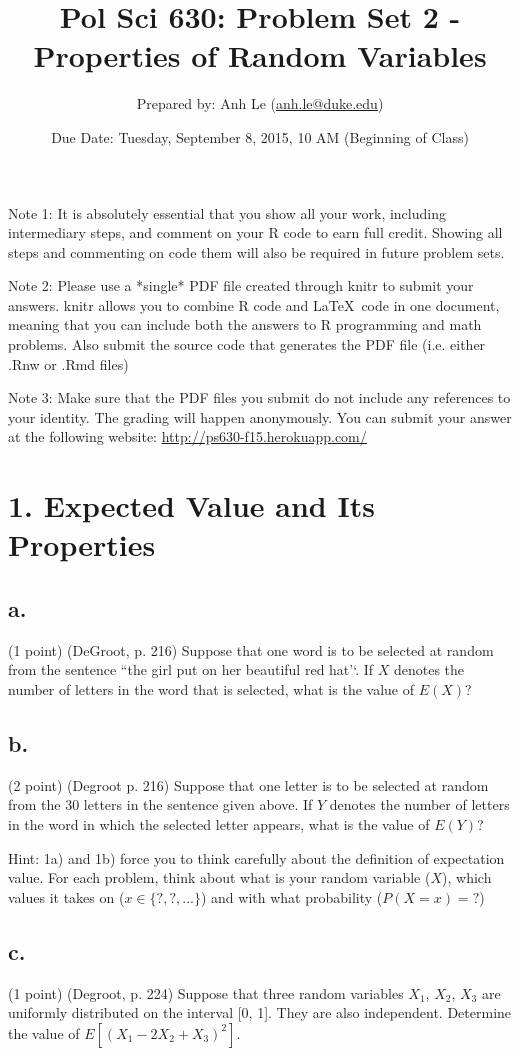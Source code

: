 \documentclass{article}\usepackage[]{graphicx}\usepackage[]{color}
\title{Pol Sci 630: Problem Set 2 - Properties of Random Variables}
\author{Prepared by: Anh Le (\href{mailto:anh.le@duke.edu}{anh.le@duke.edu})}
\date{Due Date: Tuesday, September 8, 2015, 10 AM (Beginning of Class)}
\begin{document}
\maketitle

Note 1: It is absolutely essential that you show all your work, including intermediary steps, and comment on your R code to earn full credit. Showing all steps and commenting on code them will also be required in future problem sets.

Note 2: Please use a *single* PDF file created through knitr to submit your answers. knitr allows you to combine R code and \LaTeX \ code in one document, meaning that you can include both the answers to R programming and math problems. Also submit the source code that generates the PDF file (i.e. either .Rnw or .Rmd files)

Note 3: Make sure that the PDF files you submit do not include any references to your identity. The grading will happen anonymously. You can submit your answer at the following website: \url{http://ps630-f15.herokuapp.com/}

\section*{1. Expected Value and Its Properties}

\subsection*{a.} (1 point) (DeGroot, p. 216) Suppose that one word is to be selected at random from the sentence ``the girl put on her beautiful red hat'`. If $X$ denotes the number of letters in the word that is selected, what is the value of $E(X)$?

\subsection*{b.} (2 point) (Degroot p. 216) Suppose that one letter is to be selected at random from the 30 letters in the sentence given above. If $Y$ denotes the number of letters in the word in which the selected letter appears, what is the value of $E(Y)$?

Hint: 1a) and 1b) force you to think carefully about the definition of expectation value. For each problem, think about what is your random variable ($X$), which values it takes on ($x \in \{?, ?, ...\}$) and with what probability ($P(X = x) = ?$)

\subsection*{c.} (1 point) (Degroot, p. 224) Suppose that three random variables $X_1$, $X_2$, $X_3$ are uniformly distributed on the interval [0, 1]. They are also independent. Determine the value of $E[(X_1 - 2 X_2 + X_3)^2]$.
\end{document}

